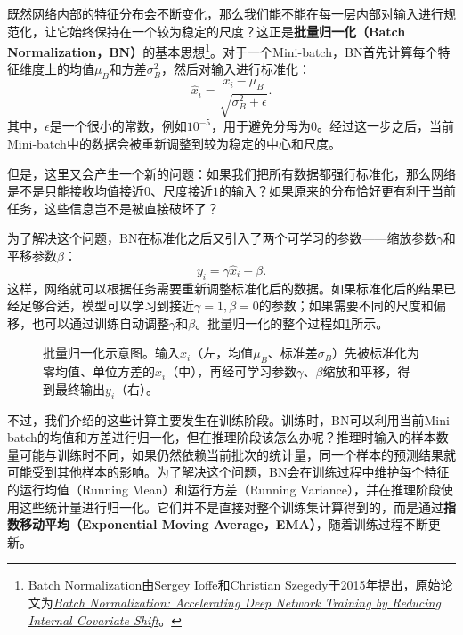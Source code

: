 既然网络内部的特征分布会不断变化，那么我们能不能在每一层内部对输入进行规范化，让它始终保持在一个较为稳定的尺度？这正是\textbf{批量归一化（Batch Normalization，BN）}的基本思想\footnote{Batch Normalization由Sergey Ioffe和Christian Szegedy于2015年提出，原始论文为\href{https://proceedings.mlr.press/v37/ioffe15.html}{\textit{Batch Normalization: Accelerating Deep Network Training by Reducing Internal Covariate Shift}}。}。对于一个Mini-batch，BN首先计算每个特征维度上的均值$\mu_B$和方差$\sigma_B^2$，然后对输入进行标准化：
$$
\hat{x}_i=\frac{x_i-\mu_B}{\sqrt{\sigma_B^2+\epsilon}}.
$$
其中，$\epsilon$是一个很小的常数，例如$10^{-5}$，用于避免分母为$0$。经过这一步之后，当前Mini-batch中的数据会被重新调整到较为稳定的中心和尺度。

但是，这里又会产生一个新的问题：如果我们把所有数据都强行标准化，那么网络是不是只能接收均值接近$0$、尺度接近$1$的输入？如果原来的分布恰好更有利于当前任务，这些信息岂不是被直接破坏了？

为了解决这个问题，BN在标准化之后又引入了两个可学习的参数——缩放参数$\gamma$和平移参数$\beta$：
$$
y_i=\gamma\hat{x}_i+\beta.
$$
这样，网络就可以根据任务需要重新调整标准化后的数据。如果标准化后的结果已经足够合适，模型可以学习到接近$\gamma=1,\beta=0$的参数；如果需要不同的尺度和偏移，也可以通过训练自动调整$\gamma$和$\beta$。批量归一化的整个过程如\cref{fig:batch_normalization}所示。

\begin{figure}[H]
    \caption{批量归一化示意图。输入$x_i$（左，均值$\mu_B$、标准差$\sigma_B$）先被标准化为零均值、单位方差的$\hat{x}_i$（中），再经可学习参数$\gamma$、$\beta$缩放和平移，得到最终输出$y_i$（右）。}
    \label{fig:batch_normalization}
\end{figure}

不过，我们介绍的这些计算主要发生在训练阶段。训练时，BN可以利用当前Mini-batch的均值和方差进行归一化，但在推理阶段该怎么办呢？推理时输入的样本数量可能与训练时不同，如果仍然依赖当前批次的统计量，同一个样本的预测结果就可能受到其他样本的影响。为了解决这个问题，BN会在训练过程中维护每个特征的运行均值（Running Mean）和运行方差（Running Variance），并在推理阶段使用这些统计量进行归一化。它们并不是直接对整个训练集计算得到的，而是通过\textbf{指数移动平均（Exponential Moving Average，EMA）}，随着训练过程不断更新。

